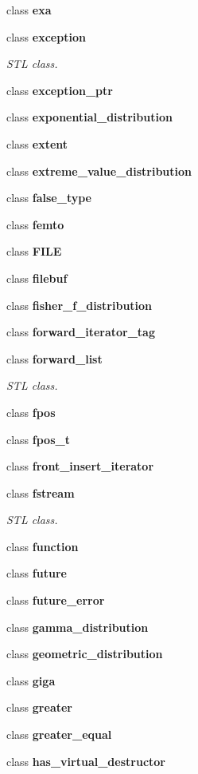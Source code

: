 \begin{DoxyCompactItemize}
class \textbf{ exa}
\item 
class \textbf{ exception}
\begin{DoxyCompactList}\small\item\em S\+TL class. \end{DoxyCompactList}\item 
class \textbf{ exception\+\_\+ptr}
\item 
class \textbf{ exponential\+\_\+distribution}
\item 
class \textbf{ extent}
\item 
class \textbf{ extreme\+\_\+value\+\_\+distribution}
\item 
class \textbf{ false\+\_\+type}
\item 
class \textbf{ femto}
\item 
class \textbf{ F\+I\+LE}
\item 
class \textbf{ filebuf}
\item 
class \textbf{ fisher\+\_\+f\+\_\+distribution}
\item 
class \textbf{ forward\+\_\+iterator\+\_\+tag}
\item 
class \textbf{ forward\+\_\+list}
\begin{DoxyCompactList}\small\item\em S\+TL class. \end{DoxyCompactList}\item 
class \textbf{ fpos}
\item 
class \textbf{ fpos\+\_\+t}
\item 
class \textbf{ front\+\_\+insert\+\_\+iterator}
\item 
class \textbf{ fstream}
\begin{DoxyCompactList}\small\item\em S\+TL class. \end{DoxyCompactList}\item 
class \textbf{ function}
\item 
class \textbf{ future}
\item 
class \textbf{ future\+\_\+error}
\item 
class \textbf{ gamma\+\_\+distribution}
\item 
class \textbf{ geometric\+\_\+distribution}
\item 
class \textbf{ giga}
\item 
class \textbf{ greater}
\item 
class \textbf{ greater\+\_\+equal}
\item 
class \textbf{ has\+\_\+virtual\+\_\+destructor}

\end{DoxyCompactItemize}

